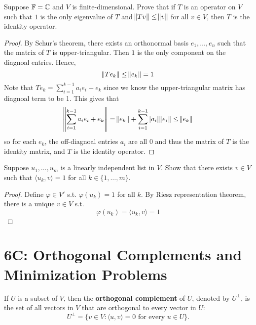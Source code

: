 \documentclass{extarticle}
\begin{document}
\begin{problem}{17}
    Suppose \(\mathbb{F} = \mathbb{C}\) and \(V\) is finite-dimensional. Prove that if \(T\) is an operator on \(V\)
    such that \(1\) is the only eigenvalue of \(T\) and \(\norm{Tv} \leq \norm{v}\) for all \(v \in V\), 
    then \(T\) is the identity operator.
\end{problem}

\begin{proof}

    By Schur's theorem, there exists an orthonormal basis \(e_1, \ldots, e_n\) such that the matrix of \(T\) is 
    upper-triangular. Then \(1\) is the only component on the diagnoal entries. Hence, 
    \[\norm{T e_k} \leq \norm{e_k} = 1\]
    Note that \(Te_k = \sum_{i=1}^{k-1}a_i e_i + e_k\) since we know the upper-triangular matrix has diagnoal term to be 1. 
    This gives that 
    \[\norm{\sum_{i=1}^{k-1} a_i e_i + e_k} = \norm{e_k} + \sum_{i=1}^{k-1}|a_i| \norm{e_i} \leq \norm{e_k}\]
    so for each \(e_k\), the off-diagnoal entries \(a_i\) are all 0 and thus the matrix of \(T\) is the identity 
    matrix, and \(T\) is the identity operator.
\end{proof}


\begin{problem}{18}
    Suppose \(u_1, \ldots, u_m\) is a linearly independent list in \(V\). Show that there exists \(v \in V\)
    such that \(\langle u_k,v \rangle = 1\) for all \(k \in \{1, \ldots, m\}\).
\end{problem}

\begin{proof}
Define \(\varphi \in V'\) s.t. \(\varphi(u_k) = 1\) for all \(k\). By Riesz representation theorem, 
there is a unique \(v \in V\) s.t. 
\[\varphi(u_k) = \langle u_k, v \rangle = 1\]
\end{proof}




\newpage 
\section*{6C: Orthogonal Complements and Minimization Problems}


\begin{definition}
    If \(U\) is a subset of \(V\), then the \textbf{orthogonal complement} of \(U\), denoted by 
    \(U^\perp\), is the set of all vectors in \(V\) that are orthogonal to every vector in \(U\):
    \[U^\perp = \{v \in V \colon \langle u,v \rangle = 0 \text{ for every } u \in U\}.\]
\end{definition}
\end{document}

